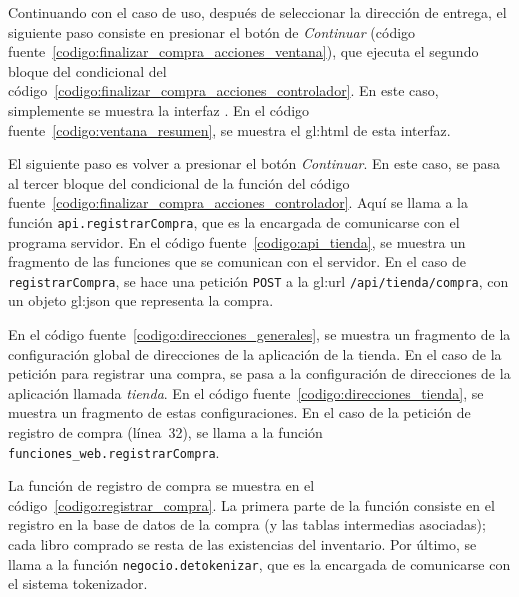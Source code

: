 Continuando con el caso de uso, después de seleccionar la dirección de entrega,
el siguiente paso consiste en presionar el botón de \textit{Continuar} (código
fuente~\ref{codigo:finalizar_compra_acciones_ventana}), que ejecuta el segundo
bloque del condicional del
código~\ref{codigo:finalizar_compra_acciones_controlador}. En este caso,
simplemente se muestra la interfaz . En
el código fuente~\ref{codigo:ventana_resumen}, se muestra el \gls{gl:html} de
esta interfaz.


El siguiente paso es volver a presionar el botón \textit{Continuar}. En este
caso, se pasa al tercer bloque del condicional de la función del código
fuente~\ref{codigo:finalizar_compra_acciones_controlador}. Aquí se llama a la
función \texttt{api.registrarCompra}, que es la encargada de comunicarse con el
programa servidor. En el código fuente~\ref{codigo:api_tienda}, se muestra un
fragmento de las funciones que se comunican con el servidor. En el caso de
\texttt{registrarCompra}, se hace una petición \texttt{POST} a la \gls{gl:url}
\texttt{/api/tienda/compra}, con un objeto \gls{gl:json} que representa
la compra.


En el código fuente~\ref{codigo:direcciones_generales}, se muestra un fragmento
de la configuración global de direcciones de la aplicación de la tienda. En el
caso de la petición para registrar una compra, se pasa a la configuración de
direcciones de la aplicación llamada \textit{tienda}. En el código
fuente~\ref{codigo:direcciones_tienda}, se muestra un fragmento de estas
configuraciones. En el caso de la petición de registro de compra (línea~32), se
llama a la función \texttt{funciones\_web.registrarCompra}.



La función de registro de compra se muestra en el
código~\ref{codigo:registrar_compra}. La primera parte de la función consiste
en el registro en la base de datos de la compra (y las tablas intermedias
asociadas); cada libro comprado se resta de las existencias del inventario. Por
último, se llama a la función \texttt{negocio.detokenizar}, que es la encargada
de comunicarse con el sistema tokenizador.

